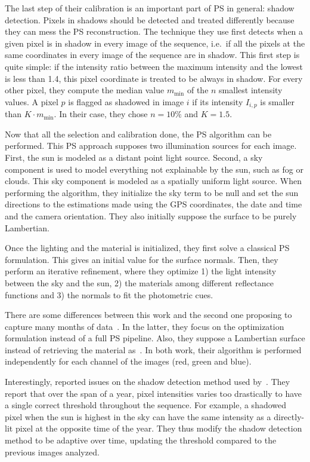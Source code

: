 The last step of their calibration is an important part of PS in general: shadow detection. Pixels in shadows should be detected and treated differently because they can mess the PS reconstruction. The technique they use first detects when a given pixel is in shadow in every image of the sequence, i.e.\ if all the pixels at the same coordinates in every image of the sequence are in shadow. This first step is quite simple: if the intensity ratio between the maximum intensity and the lowest is less than 1.4, this pixel coordinate is treated to be always in shadow. For every other pixel, they compute the median value $m_\mathrm{min}$ of the $n$ smallest intensity values. A pixel $p$ is flagged as shadowed in image $i$ if its intensity $I_{i,p}$ is smaller than $K \cdot m_\mathrm{min}$. In their case, they chose $n = 10\%$ and $K = 1.5$.

Now that all the selection and calibration done, the PS algorithm can be performed. This PS approach supposes two illumination sources for each image. First, the sun is modeled as a distant point light source. Second, a sky component is used to model everything not explainable by the sun, such as fog or clouds. This sky component is modeled as a spatially uniform light source. When performing the algorithm, they initialize the sky term to be null and set the sun directions to the estimations made using the GPS coordinates, the date and time and the camera orientation. They also initially suppose the surface to be purely Lambertian.

Once the lighting and the material is initialized, they first solve a classical PS formulation. This gives an initial value for the surface normals. Then, they perform an iterative refinement, where they optimize 1) the light intensity between the sky and the sun, 2) the materials among different reflectance functions and 3) the normals to fit the photometric cues.

There are some differences between this work and the second one proposing to capture many months of data~\cite{abrams-eccv-12}. In the latter, they focus on the optimization formulation instead of a full PS pipeline. Also, they suppose a Lambertian surface instead of retrieving the material as~\cite{ackermann-cvpr-12}. In both work, their algorithm is performed independently for each channel of the images (red, green and blue).

Interestingly, \cite{abrams-eccv-12} reported issues on the shadow detection method used by~\cite{ackermann-cvpr-12}. They report that over the span of a year, pixel intensities varies too drastically to have a single correct threshold throughout the sequence. For example, a shadowed pixel when the sun is highest in the sky can have the same intensity as a directly-lit pixel at the opposite time of the year. They thus modify the shadow detection method to be adaptive over time, updating the threshold compared to the previous images analyzed.

